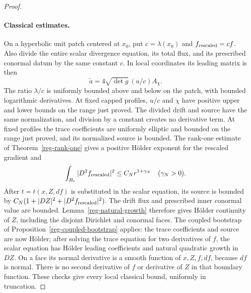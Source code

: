 \begin{proof}
\paragraph{Classical estimates.}
On a hyperbolic unit patch centered at \(x_0\), put
\(c=\lambda(x_0)\) and \(f_{\rm rescaled}=cf\). Also divide the
entire scalar divergence equation, its total flux, and its prescribed
conormal datum by the same constant \(c\). In local coordinates its
leading matrix is then
\[
 \widetilde a=4\sqrt{\det g}\,(u/c)A_\chi.
\]
The ratio \(\lambda/c\) is uniformly bounded above and below on the
patch, with bounded logarithmic derivatives. At fixed capped profiles,
\(u/c\) and \(\chi\) have positive upper and lower bounds on the
range just proved. The divided drift and source have the same
normalization, and division by a constant creates no derivative term.
At fixed profiles the trace coefficients are uniformly
elliptic and bounded on the range just proved, and its normalized
source is bounded. The rank-one estimate of
Theorem~\ref{reg-rank-one} gives a positive H\"older exponent for the
rescaled gradient and
\[
 \int_{B_r}|D^2f_{\rm rescaled}|^2\le C_Nr^{1+\gamma_N}
 \quad(\gamma_N>0).
\]
After \(t=t(x,Z,df)\) is substituted in the scalar equation, its
source is bounded by
\(C_N(1+|DZ|^2+|D^2f_{\rm rescaled}|^2)\).
The drift flux and prescribed inner conormal value are bounded.
Lemma~\ref{reg-natural-growth} therefore gives H\"older continuity
of \(Z\), including the disjoint Dirichlet and conormal faces.
The coupled bootstrap of Proposition~\ref{reg-coupled-bootstrap} applies:
the trace coefficients and source are now H\"older; after solving
the trace equation for two derivatives of \(f\), the scalar equation
has H\"older leading coefficients and natural quadratic growth in
\(DZ\). On a face its normal derivative is a smooth function of
\(x,Z,f,df\), because \(df\) is normal. There is no second derivative
of \(f\) or derivative of \(Z\) in that boundary function. These
checks give every local classical bound, uniformly in truncation.


\end{proof}
